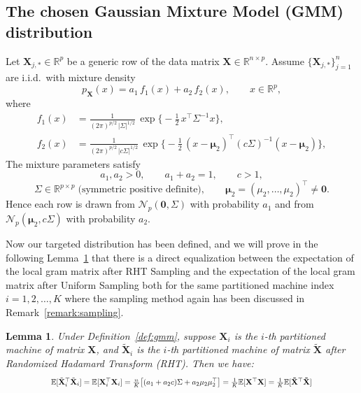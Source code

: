 \documentclass[11pt]{article}
\numberwithin{equation}{section}
\theoremstyle{plain}
\newtheorem{lemma}[theorem]{Lemma}
\theoremstyle{definition}
\theoremstyle{remark}
\begin{document}
\subsection{The chosen Gaussian Mixture Model (GMM) distribution}
\begin{defin}
  \label{def:gmm}
  Let $\mathbf{X}_{j,\ast}\in\mathbb R^{p}$ be a generic row of the data matrix $\mathbf X\in\mathbb R^{n\times p}$.
  Assume $\{\mathbf{X}_{j,\ast}\}_{j=1}^{n}$ are i.i.d.\ with mixture density
  \[
  p_{\mathbf{X}}(x)=a_{1}\,f_{1}(x)+a_{2}\,f_{2}(x), \qquad x\in\mathbb R^{p},
  \]
  where
  \begingroup\small
  \[
  \begin{aligned}
  f_{1}(x) &=
    \frac{1}{(2\pi)^{p/2}\,|\Sigma|^{1/2}}\,
    \exp\!\bigl\{-\tfrac12\,x^{\top}\Sigma^{-1}x\bigr\},\\[4pt]
  f_{2}(x) &=
    \frac{1}{(2\pi)^{p/2}\,|c\Sigma|^{1/2}}\,
    \exp\!\bigl\{-\tfrac12\,(x-\boldsymbol\mu_{2})^{\!\top}(c\Sigma)^{-1}(x-\boldsymbol\mu_{2})\bigr\},
  \end{aligned}
  \]
  \endgroup
  \smallskip
  \noindent
  The mixture parameters satisfy
  \begingroup\small
  \[
  a_{1},a_{2}>0,\qquad a_{1}+a_{2}=1,\qquad c>1,
  \]
  \[
  \Sigma\in\mathbb R^{p\times p}\;\text{(symmetric positive definite)},\qquad
  \boldsymbol\mu_{2}=(\mu_{2},\ldots,\mu_{2})^{\!\top}\neq\boldsymbol 0.
  \]
  \endgroup
  Hence each row is drawn from $\mathcal N_{p}(\boldsymbol 0,\Sigma)$ with probability $a_{1}$ and from
  $\mathcal N_{p}(\boldsymbol\mu_{2},c\Sigma)$ with probability $a_{2}$.
  \end{defin}

Now our targeted distribution has been defined, and we will prove in the following Lemma~\ref{lemma:expectation} that there is a direct equalization between the expectation of the local gram matrix after RHT Sampling and
the expectation of the local gram matrix after Uniform Sampling both for the same partitioned machine index $i = 1,2,\ldots,K$
where the sampling method again has been discussed in Remark~\ref{remark:sampling}.

\begin{lemma}
\label{lemma:expectation}
Under Definition~\ref{def:gmm}, suppose $\mathbf{X}_{i}$ is the $i$-th partitioned machine of matrix $\mathbf{X}$, and $\mathbf{\tilde{X}}_{i}$ is the $i$-th partitioned machine of matrix $\mathbf{\tilde{X}}$ after Randomized Hadamard Transform (RHT).
Then we have:
\begin{equation*}
  \scalebox{0.79}{$
  \mathbb{E}[\tilde{\mathbf{X}}_i^{\top}\tilde{\mathbf{X}}_i]
    =\mathbb{E}[{\mathbf{X}}_i^{\top}{\mathbf{X}}_i]
    =\frac{n}{K}\bigl[(a_{1}+a_{2}c)\Sigma+a_{2}\mu_{2}\mu_{2}^{\top}\bigr]
    = \frac{1}{K} \mathbb{E}[\mathbf{X}^{\top} \mathbf{X}]
    = \frac{1}{K} \mathbb{E}[\mathbf{\tilde{X}}^{\top} \mathbf{\tilde{X}}]
  $}
\end{equation*}
\end{lemma}
\end{document}
